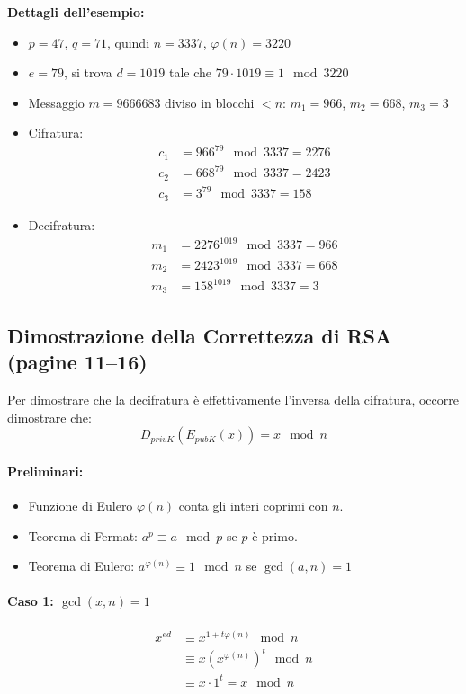 \documentclass{report}
\begin{document}
\textbf{Dettagli dell'esempio:}
\begin{itemize}
  \item $p = 47$, $q = 71$, quindi $n = 3337$, $\varphi(n) = 3220$
  \item $e = 79$, si trova $d = 1019$ tale che $79 \cdot 1019 \equiv 1 \mod 3220$
  \item Messaggio $m = 9666683$ diviso in blocchi $< n$: $m_1 = 966$, $m_2 = 668$, $m_3 = 3$
  \item Cifratura:
  \begin{align*}
  c_1 &= 966^{79} \mod 3337 = 2276 \\
  c_2 &= 668^{79} \mod 3337 = 2423 \\
  c_3 &= 3^{79} \mod 3337 = 158
  \end{align*}
  \item Decifratura:
  \begin{align*}
  m_1 &= 2276^{1019} \mod 3337 = 966 \\
  m_2 &= 2423^{1019} \mod 3337 = 668 \\
  m_3 &= 158^{1019} \mod 3337 = 3
  \end{align*}
\end{itemize}

\subsection{Dimostrazione della Correttezza di RSA (pagine 11--16)}
Per dimostrare che la decifratura \`e effettivamente l'inversa della cifratura, occorre dimostrare che:
\begin{equation}
D_{privK}(E_{pubK}(x)) = x \mod n
\end{equation}

\paragraph{Preliminari:}
\begin{itemize}
  \item Funzione di Eulero $\varphi(n)$ conta gli interi coprimi con $n$.
  \item Teorema di Fermat: $a^p \equiv a \mod p$ se $p$ \`e primo.
  \item Teorema di Eulero: $a^{\varphi(n)} \equiv 1 \mod n$ se $\gcd(a, n) = 1$
\end{itemize}

\paragraph{Caso 1: $\gcd(x, n) = 1$}
\begin{align*}
x^{ed} &\equiv x^{1 + t \varphi(n)} \mod n \\
       &\equiv x (x^{\varphi(n)})^t \mod n \\
       &\equiv x \cdot 1^t = x \mod n
\end{align*}
\end{document}
